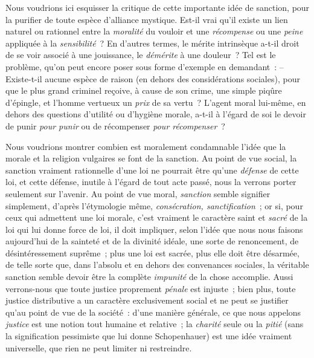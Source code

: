 \documentclass[french,twoside]{book} %
\begin{document}
Nous voudrions ici esquisser la critique de cette importante idée de sanction, pour la purifier de toute espèce d’alliance mystique. Est-il vrai qu’il existe un lien naturel ou rationnel entre la \emph{moralité} du vouloir et une \emph{récompense} ou une \emph{peine} appliquée à la \emph{sensibilité} ? En d’autres termes, le mérite intrinsèque a-t-il droit de se voir associé à une jouissance, le \emph{démérite} à une douleur ? Tel est le problème, qu’on peut encore poser sous forme d’exemple en demandant : – Existe-t-il aucune espèce de raison (en dehors des considérations sociales), pour que le plus grand criminel reçoive, à cause de son crime, une simple piqûre d’épingle, et l’homme vertueux un \emph{prix} de sa vertu ? L’agent moral lui-même, en dehors des questions d’utilité ou d’hygiène morale, a-t-il à l’égard de soi le devoir de punir \emph{pour punir} ou de récompenser \emph{pour récompenser} ?\par
Nous voudrions montrer combien est moralement condamnable l’idée que la morale et la religion vulgaires se font de la sanction. Au point de vue social, la sanction vraiment rationnelle d’une loi ne pourrait être qu’une \emph{défense} de cette loi, et cette défense, inutile à l’égard de tout acte passé, nous la verrons porter seulement sur l’avenir. Au point de vue moral, \emph{sanction} semble signifier simplement, d’après l’étymologie même, \emph{consécration, sanctification} ; or si, pour ceux qui admettent une loi morale, c’est vraiment le caractère saint et \emph{sacré} de la loi qui lui donne force de loi, il doit impliquer, selon l’idée que nous nous faisons aujourd’hui de la sainteté et de la divinité idéale, une sorte de renoncement, de désintéressement suprême ; plus une loi est sacrée, plus elle doit être désarmée, de telle sorte que, dans l’absolu et en dehors des convenances sociales, la véritable sanction semble devoir être la complète \emph{impunité} de la chose accomplie. Aussi verrons-nous que toute justice proprement \emph{pénale} est injuste ; bien plus, toute justice distributive a un caractère exclusivement social et ne peut se justifier qu’au point de vue de la société : d’une manière générale, ce que nous appelons \emph{justice} est une notion tout humaine et relative ; la \emph{charité} seule ou la \emph{pitié} (sans la signification pessimiste que lui donne Schopenhauer) est une idée vraiment universelle, que rien ne peut limiter ni restreindre.
\end{document}
